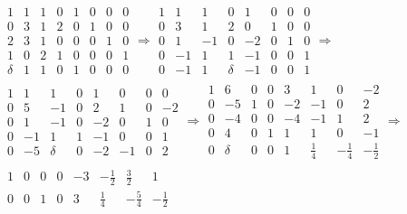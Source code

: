 \documentclass[a4paper, showtrims]{memoir}
\theoremstyle{plain}
\theoremstyle{remark}
\theoremstyle{definition}
\begin{document}
\begin{multline*}
	\begin{array}{cccc|cccc}
		\boxed{1} & 1 & 1 & 0 & 1 & 0 & 0 & 0 \\
		0         & 3 & 1 & 2 & 0 & 1 & 0 & 0 \\
		2         & 3 & 1 & 0 & 0 & 0 & 1 & 0 \\
		1         & 0 & 2 & 1 & 0 & 0 & 0 & 1 \\
		\hline
		\delta    & 1 & 1 & 0 & 1 & 0 & 0 & 0
	\end{array}\Rightarrow
	\begin{array}{cccc|cccc}
		1 & 1  & 1  & 0         & 1  & 0 & 0 & 0 \\
		0 & 3  & 1  & 2         & 0  & 1 & 0 & 0 \\
		0 & 1  & -1 & 0         & -2 & 0 & 1 & 0 \\
		0 & -1 & 1  & \boxed{1} & -1 & 0 & 0 & 1 \\
		\hline
		0 & -1 & 1  & \delta    & -1 & 0 & 0 & 1
	\end{array}\Rightarrow
	\\
	\begin{array}{cccc|cccc}
		1 & 1  & 1          & 0 & 1  & 0  & 0 & 0  \\
		0 & 5  & \boxed{-1} & 0 & 2  & 1  & 0 & -2 \\
		0 & 1  & -1         & 0 & -2 & 0  & 1 & 0  \\
		0 & -1 & 1          & 1 & -1 & 0  & 0 & 1  \\
		\hline
		0 & -5 & \delta     & 0 & -2 & -1 & 0 & 2
	\end{array}\Rightarrow
	\begin{array}{cccc|cccc}
		1 & 6          & 0 & 0 & 3  & 1           & 0            & -2           \\
		0 & -5         & 1 & 0 & -2 & -1          & 0            & 2            \\
		0 & \boxed{-4} & 0 & 0 & -4 & -1          & 1            & 2            \\
		0 & 4          & 0 & 1 & 1  & 1           & 0            & -1           \\
		\hline
		0 & \delta     & 0 & 0 & 1  & \frac{1}{4} & -\frac{1}{4} & -\frac{1}{2}
	\end{array}\Rightarrow
	\\
	\begin{array}{cccc|cccc}
		1 & 0 & 0 & 0 & -3 & -\frac{1}{2} & \frac{3}{2}  & 1            \\
		0 & 0 & 1 & 0 & 3  & \frac{1}{4}  & -\frac{5}{4} & -\frac{1}{2} \\

\end{array}
\end{multline*}
\end{document}
